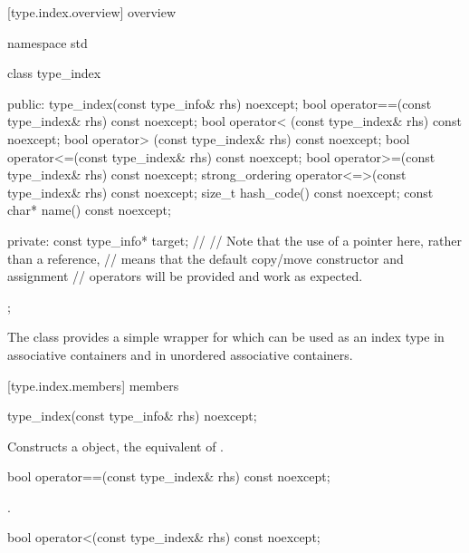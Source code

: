 [type.index.overview]{ overview}

%
\begin{codeblock}
namespace std {
  class type_index {
  public:
    type_index(const type_info& rhs) noexcept;
    bool operator==(const type_index& rhs) const noexcept;
    bool operator< (const type_index& rhs) const noexcept;
    bool operator> (const type_index& rhs) const noexcept;
    bool operator<=(const type_index& rhs) const noexcept;
    bool operator>=(const type_index& rhs) const noexcept;
    strong_ordering operator<=>(const type_index& rhs) const noexcept;
    size_t hash_code() const noexcept;
    const char* name() const noexcept;

  private:
    const type_info* target;    // \expos
    // Note that the use of a pointer here, rather than a reference,
    // means that the default copy/move constructor and assignment
    // operators will be provided and work as expected.
  };
}
\end{codeblock}

\pnum
The class  provides a simple wrapper for
 which can be used as an index type in associative
containers and in unordered associative
containers.

[type.index.members]{ members}

%
\begin{itemdecl}
type_index(const type_info& rhs) noexcept;
\end{itemdecl}

\begin{itemdescr}
\pnum
\effects
Constructs a  object, the equivalent of .
\end{itemdescr}

%
\begin{itemdecl}
bool operator==(const type_index& rhs) const noexcept;
\end{itemdecl}

\begin{itemdescr}
\pnum
\returns
{}.
\end{itemdescr}

%
\begin{itemdecl}
bool operator<(const type_index& rhs) const noexcept;
\end{itemdecl}

